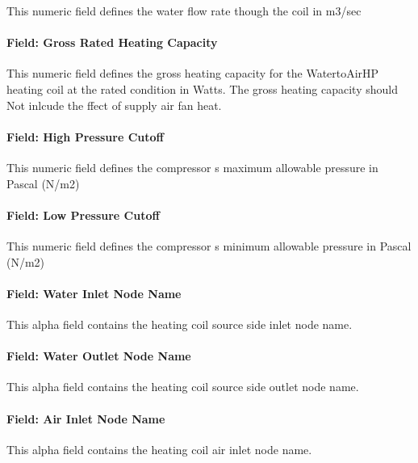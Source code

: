 This numeric field defines the water flow rate though the coil in m3/sec

\paragraph{Field: Gross Rated Heating Capacity}\label{field-gross-rated-heating-capacity-3}

This numeric field defines the gross heating capacity for the WatertoAirHP heating coil at the rated condition in Watts. The gross heating capacity should Not inlcude the ffect of supply air fan heat.

\paragraph{Field: High Pressure Cutoff}\label{field-high-pressure-cutoff-1}

This numeric field defines the compressor s maximum allowable pressure in Pascal (N/m2)

\paragraph{Field: Low Pressure Cutoff}\label{field-low-pressure-cutoff-1}

This numeric field defines the compressor s minimum allowable pressure in Pascal (N/m2)

\paragraph{Field: Water Inlet Node Name}\label{field-water-inlet-node-name-8}

This alpha field contains the heating coil source side inlet node name.

\paragraph{Field: Water Outlet Node Name}\label{field-water-outlet-node-name-8}

This alpha field contains the heating coil source side outlet node name.

\paragraph{Field: Air Inlet Node Name}\label{field-air-inlet-node-name-19}

This alpha field contains the heating coil air inlet node name.

